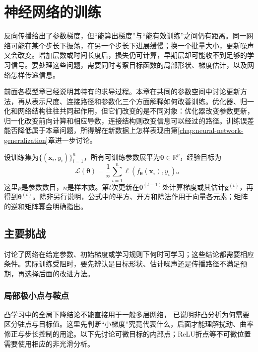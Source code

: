 \chapter{神经网络的训练}
\label{chap:neural-network-training}

反向传播给出了参数梯度，但“能算出梯度”与“能有效训练”之间仍有距离。同一网络可能在某个步长下振荡，在另一个步长下进展缓慢；换一个批量大小，更新噪声又会改变。增加层数或时间长度后，损失仍可计算，早期层却可能收不到足够的学习信号。要处理这些问题，需要同时考察目标函数的局部形状、梯度估计，以及网络怎样传递信息。

前面各模型章已经说明其特有的求导过程。本章在共同的参数空间中讨论更新方法，再从表示尺度、连接路径和参数化三个方面解释如何改善训练。优化器、归一化和网络结构往往共同起作用，但它们改变的是不同对象：优化器改变参数更新，归一化改变前向计算和相应导数，连接结构则改变信息可以经过的路径。训练误差能否降低属于本章问题，所得解在新数据上怎样表现由第\ref{chap:neural-network-generalization}章进一步讨论。

设训练集为$\{(\bm x_i,y_i)\}_{i=1}^n$，所有可训练参数展平为$\bm\theta\in\mathbb R^p$，经验目标为
\begin{equation}
  \mathcal L(\bm\theta)=\frac1n\sum_{i=1}^n
  \ell(f_{\bm\theta}(\bm x_i),y_i)\text{。}
  \label{eq:training-objective}
\end{equation}
这里$p$是参数数目，$n$是样本数。第$t$次更新在$\bm\theta^{(t-1)}$处计算梯度或其估计$\bm g^{(t)}$，再得到$\bm\theta^{(t)}$。除非另行说明，公式中的平方、开方和除法作用于向量各元素；矩阵的逆和矩阵幂会明确指出。

\section{主要挑战}
\label{sec:training-challenges}

讨论了网络在给定参数、初始梯度或学习规则下何时可学习；这些结论都需要相应条件。实际训练受阻时，要先辨认是目标形状、估计噪声还是传播路径不满足预期，再选择后面的改进方法。

\subsection{局部极小点与鞍点}
\label{sec:training-stationary-points}

凸学习中的全局下降结论不能直接用于一般多层网络，
已说明非凸分析为何需要区分驻点与目标值。这里先判断“小梯度”究竟代表什么，后面才能理解扰动、曲率修正与步长控制的用途。以下先讨论可微目标的内部点；ReLU折点等不可微位置需要使用相应的非光滑分析。


